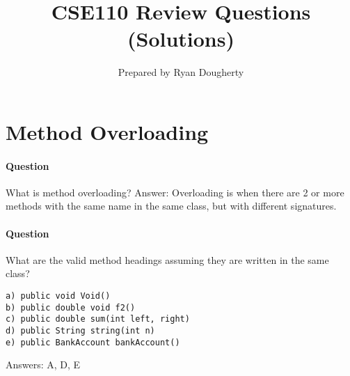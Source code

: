 \documentclass{article}
\title{CSE110 Review Questions (Solutions)}
\author{Prepared by Ryan Dougherty}
\date{}
\begin{document}
\maketitle

\section{Method Overloading}


\setcounter{question_num}{1}
\paragraph{Question }
What is method overloading? {\color{red}Answer: Overloading is when there are 2 or more methods with the same name in the same class, but with different signatures. }

\addtocounter{question_num}{1}
\paragraph{Question }
What are the valid method headings assuming they are written in the same class?
\begin{lstlisting}
a) public void Void()
b) public double void f2()
c) public double sum(int left, right)
d) public String string(int n)
e) public BankAccount bankAccount()
\end{lstlisting}
{\color{red} Answers: A, D, E}
\end{document}
